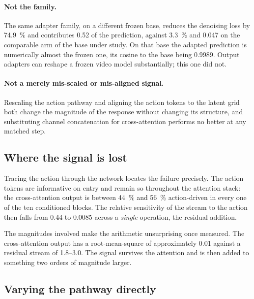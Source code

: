 \paragraph{Not the family.} The same adapter family, on a different frozen
base, reduces the denoising loss by \SI{74.9}{\percent} and contributes
\num{0.52} of the prediction, against \SI{3.3}{\percent} and \num{0.047} on
the comparable arm of the base under
study. On that base the adapted
prediction is numerically almost the frozen one, its cosine to the base
being \num{0.9989}. Output adapters can reshape a frozen video model
substantially; this one did not.

\paragraph{Not a merely mis-scaled or mis-aligned signal.} Rescaling the
action pathway and aligning the action tokens to the latent grid both
change the magnitude of the response without changing its structure, and
substituting channel concatenation for cross-attention performs no better at
any matched step.

\subsection{Where the signal is lost}

Tracing the action through the network locates the failure precisely. The
action tokens are informative on entry and remain so throughout the
attention stack: the cross-attention output is between \SI{44}{\percent} and
\SI{56}{\percent} action-driven in every one of the ten conditioned blocks.
The relative sensitivity of the stream to the action then falls from
\num{0.44} to \num{0.0085} across a \emph{single} operation, the residual
addition.

The magnitudes involved make the arithmetic unsurprising once measured. The
cross-attention output has a root-mean-square of approximately \num{0.01}
against a residual stream of \numrange{1.8}{3.0}. The signal survives the
attention and is then added to something two orders of magnitude larger.

\subsection{Varying the pathway directly}

